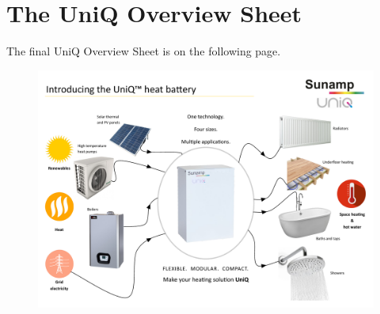 
\chapter{The UniQ Overview Sheet} %

\label{App:Overview} %


%

The final UniQ Overview Sheet is on the following page.

%


\begin{figure}
    \centering
	\includegraphics[width=\textwidth]{Appendices/PIS_Overview.pdf}
\end{figure}